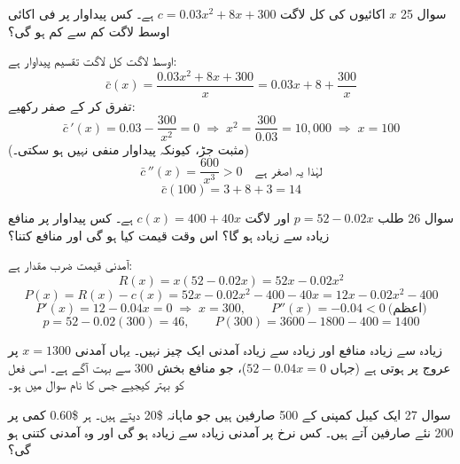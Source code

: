 \begin{sawal}{سوال \textenglish{25}}
\(x\) اکائیوں کی کل لاگت \(c=0.03x^{2}+8x+300\) ہے۔ کس پیداوار پر فی اکائی
اوسط لاگت کم سے کم ہو گی؟
\end{sawal}

\begin{hal}
اوسط لاگت کل لاگت تقسیم پیداوار ہے:
\[
\bar{c}(x)=\frac{0.03x^{2}+8x+300}{x}=0.03x+8+\frac{300}{x}
\]
تفرق کر کے صفر رکھیے:
\[
\bar{c}\,'(x)=0.03-\frac{300}{x^{2}}=0
\;\Longrightarrow\;
x^{2}=\frac{300}{0.03}=10{,}000
\;\Longrightarrow\;
x=100
\]
(مثبت جڑ، کیونکہ پیداوار منفی نہیں ہو سکتی۔)
\[
\bar{c}\,''(x)=\frac{600}{x^{3}}>0 \quad\text{لہٰذا یہ اصغر ہے}
\]
\[
\bar{c}(100)=3+8+3=14
\]

\end{hal}

\begin{sawal}{سوال \textenglish{26}}
طلب \(p=52-0.02x\) اور لاگت \(c(x)=400+40x\) ہے۔ کس پیداوار پر منافع زیادہ سے
زیادہ ہو گا؟ اس وقت قیمت کیا ہو گی اور منافع کتنا؟
\end{sawal}

\begin{hal}
آمدنی قیمت ضرب مقدار ہے:
\[
R(x)=x(52-0.02x)=52x-0.02x^{2}
\]
\[
P(x)=R(x)-c(x)=52x-0.02x^{2}-400-40x=12x-0.02x^{2}-400
\]
\[
P'(x)=12-0.04x=0 \;\Longrightarrow\; x=300,
\qquad
P''(x)=-0.04<0 \ \text{(اعظم)}
\]
\[
p=52-0.02(300)=46,
\qquad
P(300)=3600-1800-400=1400
\]

\end{hal}

\begin{ghalti}
زیادہ سے زیادہ منافع اور زیادہ سے زیادہ آمدنی ایک چیز نہیں۔ یہاں آمدنی
\(x=1300\) پر عروج پر ہوتی ہے (جہاں \(52-0.04x=0\))، جو منافع بخش
\textenglish{300} سے بہت آگے ہے۔ اسی فعل کو بہتر کیجیے جس کا نام سوال میں ہو۔
\end{ghalti}

\begin{sawal}{سوال \textenglish{27}}
ایک کیبل کمپنی کے \textenglish{500} صارفین ہیں جو ماہانہ \textenglish{\$20}
دیتے ہیں۔ ہر \textenglish{\$0.60} کمی پر \textenglish{200} نئے صارفین آتے ہیں۔
کس نرخ پر آمدنی زیادہ سے زیادہ ہو گی اور وہ آمدنی کتنی ہو گی؟
\end{sawal}

